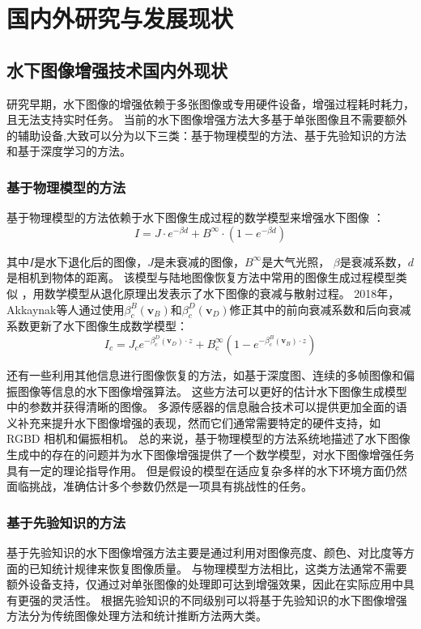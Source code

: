 \section{国内外研究与发展现状}
\subsection{水下图像增强技术国内外现状}
研究早期，水下图像的增强依赖于多张图像或专用硬件设备，增强过程耗时耗力，且无法支持实时任务。
当前的水下图像增强方法大多基于单张图像且不需要额外的辅助设备,大致可以分为以下三类：基于物理模型的方法、基于先验知识的方法和基于深度学习的方法。
\subsubsection{基于物理模型的方法}
基于物理模型的方法依赖于水下图像生成过程的数学模型来增强水下图像 \cite{uw_img_math1}\cite{uw_img_math2}：
\begin{equation}
I=J \cdot e^{-\beta d}+B^{\infty} \cdot\left(1-e^{-\beta d}\right) 
\label{IFM1}
\end{equation}

其中$I$是水下退化后的图像，$J$是未衰减的图像，$B^{\infty}$是大气光照， $\beta$是衰减系数，$d$是相机到物体的距离。
该模型与陆地图像恢复方法中常用的图像生成过程模型类似 \cite{ifm}，用数学模型从退化原理出发表示了水下图像的衰减与散射过程。
2018年，Akkaynak等人\cite{modified_uw_img_math}通过使用$\beta_c^B\left(\mathbf{v}_B\right)$和$\beta_c^D\left(\mathbf{v}_D\right)$修正其中的前向衰减系数和后向衰减系数更新了水下图像生成数学模型：
\begin{equation}
I_c=J_c e^{-\beta_c^D\left(\mathbf{v}_D\right) \cdot z}+B_c^{\infty}\left(1-e^{-\beta_c^B\left(\mathbf{v}_B\right) \cdot z}\right)
\label{IFM2}
\end{equation}

还有一些利用其他信息进行图像恢复的方法，如基于深度图\cite{depth_img}、连续的多帧图像\cite{multi_frame}和偏振图像\cite{U2PNet}等信息的水下图像增强算法。
这些方法可以更好的估计水下图像生成模型中的参数并获得清晰的图像。
多源传感器的信息融合技术\cite{fusion}可以提供更加全面的语义补充来提升水下图像增强的表现，然而它们通常需要特定的硬件支持，如 RGBD 相机和偏振相机。
总的来说，基于物理模型的方法系统地描述了水下图像生成中的存在的问题并为水下图像增强提供了一个数学模型，对水下图像增强任务具有一定的理论指导作用。
但是假设的模型在适应复杂多样的水下环境方面仍然面临挑战，准确估计多个参数仍然是一项具有挑战性的任务。

\subsubsection{基于先验知识的方法}
基于先验知识的水下图像增强方法主要是通过利用对图像亮度、颜色、对比度等方面的已知统计规律来恢复图像质量。
与物理模型方法相比，这类方法通常不需要额外设备支持，仅通过对单张图像的处理即可达到增强效果，因此在实际应用中具有更强的灵活性。
根据先验知识的不同级别可以将基于先验知识的水下图像增强方法分为传统图像处理方法和统计推断方法两大类。

